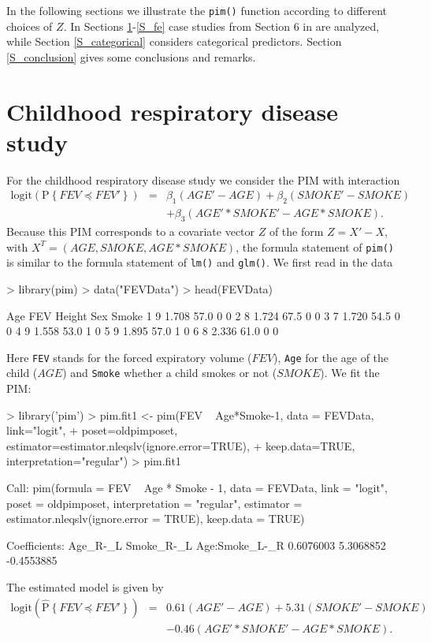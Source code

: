 \documentclass[12pt]{article}
\newcommand{\prob}[1]{\text{P}\left\{#1\right\}}
\newcommand{\hatprob}[1]{\hat{\text{P}}\left\{#1\right\}}
\newcommand{\leqs}{\preccurlyeq}
\begin{document}
In the following sections we illustrate the \texttt{pim()} function according to different choices of $Z$. In Sections \ref{S_crds}-\ref{S_fe} case studies from Section 6 in \cite{Thas2012} are analyzed, while Section \ref{S_categorical} considers categorical predictors. Section \ref{S_conclusion} gives some conclusions and remarks.  




\section{Childhood respiratory disease study}\label{S_crds}

For the childhood respiratory disease study we consider the PIM with interaction
\begin{eqnarray*}
\text{logit} \left( \prob{FEV \leqs FEV' } \right) &=& \beta_1 (AGE' - AGE) + \beta_2(SMOKE' - SMOKE) \\ 
												   & &  + \beta_3 (AGE'*SMOKE' - AGE*SMOKE). 
\end{eqnarray*}
Because this PIM corresponds to a covariate vector $Z$ of the form $Z = X' -X$, with $X^T = (AGE, SMOKE, AGE*SMOKE)$, the formula statement of \texttt{pim()} is similar to the formula statement of \texttt{lm()} and \texttt{glm()}. We first read in the data
\begin{Schunk}
\begin{Sinput}
> library(pim)
> data("FEVData")
> head(FEVData)
\end{Sinput}
\begin{Soutput}
  Age   FEV Height Sex Smoke
1   9 1.708   57.0   0     0
2   8 1.724   67.5   0     0
3   7 1.720   54.5   0     0
4   9 1.558   53.0   1     0
5   9 1.895   57.0   1     0
6   8 2.336   61.0   0     0
\end{Soutput}
\end{Schunk}
Here \verb|FEV| stands for the forced expiratory volume ($FEV$), \verb|Age| for the age of the child ($AGE$) and \verb|Smoke| whether a child smokes or not ($SMOKE$). We fit the PIM:
\begin{Schunk}
\begin{Sinput}
> library('pim')
> pim.fit1 <- pim(FEV ~ Age*Smoke-1, data = FEVData, link="logit", 
+ 								poset=oldpimposet, estimator=estimator.nleqslv(ignore.error=TRUE), 
+ 								keep.data=TRUE, interpretation="regular")
> pim.fit1
\end{Sinput}
\begin{Soutput}
Call:
pim(formula = FEV ~ Age * Smoke - 1, data = FEVData, link = "logit", 
    poset = oldpimposet, interpretation = "regular", estimator = estimator.nleqslv(ignore.error = TRUE), 
    keep.data = TRUE)

Coefficients:
      Age_R-_L     Smoke_R-_L Age:Smoke_L-_R 
     0.6076003      5.3068852     -0.4553885 
\end{Soutput}
\end{Schunk}
The estimated model is given by
\begin{eqnarray*}
\text{logit} \left( \hatprob{FEV \leqs FEV' } \right) &=& 0.61 (AGE' - AGE) + 5.31(SMOKE' - SMOKE) \\ 
												   & &   -0.46 (AGE'*SMOKE' - AGE*SMOKE). 
\end{eqnarray*}
\end{document}
